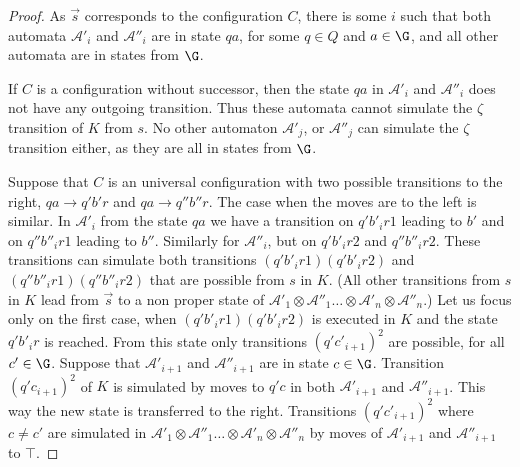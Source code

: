 \documentclass{LMCS}
\theoremstyle{plain}\newtheorem{remark}{Remark}
\theoremstyle{plain}\newtheorem{lemma}[thm]{Lemma}
\renewcommand{\Aa}{\mathcal{A}}
\newcommand{\vecs}{\vec s}
\newcommand{\vAap}{\Aa'_1\otimes\Aa''_1\dots\otimes\Aa'_n\otimes\Aa''_n}
\newcommand{\choice}{\zeta}
\begin{document}
\begin{proof}
  As $\vecs$ corresponds to the configuration $C$, there is some $i$
  such that both automata $\Aa'_i$ and $\Aa''_i$ are in state $qa$,
  for some $q \in Q$ and $a \in \G$, and all other automata are in
  states from $\G$.

  If $C$ is a configuration without successor, then the state $qa$ in
  $\Aa'_i$ and $\Aa''_i$ does not have any outgoing transition. Thus
  these automata cannot simulate the $\choice$ transition of $K$ from
  $s$. No other automaton $\Aa'_j$, or $\Aa''_j$ can simulate the
  $\choice$ transition either, as they are all in states from $\G$.

  Suppose that $C$ is an universal configuration with two possible
  transitions to the right, $qa\to q'b'r$ and $qa\to q''b''r$. The
  case when the moves are to the left is similar. In $\Aa'_i$ from the
  state $qa$ we have a transition on $q'b'_ir1$ leading to $b'$ and on
  $q''b''_ir1$ leading to $b''$. Similarly for $\Aa''_i$, but on
  $q'b'_ir2$ and $q''b''_ir2$. These transitions can simulate both
  transitions $(q'b'_ir1)(q'b'_ir2)$ and $(q''b''_ir1)(q''b''_ir2)$
  that are possible from $s$ in $K$. (All other transitions from $s$ in
  $K$ lead from $\vecs$ to a non proper state of $\vAap$.) Let us focus
  only on the first case, when $(q'b'_ir1)(q'b'_ir2)$ is executed in $K$
  and the state $q'b'_ir$ is reached. From this state only 
  transitions $(q'c'_{i+1})^2$ are possible, for all $c'\in
  \G$. Suppose that $\Aa'_{i+1}$ and $\Aa''_{i+1}$ are in state
  $c\in\G$. Transition $(q'c_{i+1})^2$ of $K$ is simulated by moves
  to $q'c$ in both $\Aa'_{i+1}$ and $\Aa''_{i+1}$.  This way the new
  state is transferred to the right.  Transitions $(q'c'_{i+1})^2$
  where $c\not=c'$ are simulated in $\vAap$ by moves of $\Aa'_{i+1}$
  and $\Aa''_{i+1}$ to $\top$. 


\end{proof}
\end{document}
